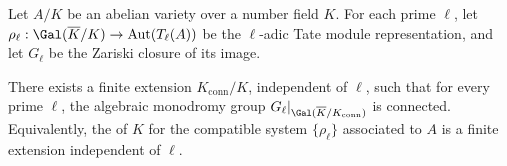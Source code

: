 \begin{theorem} \label{theorem:existence_and_ell_independence_of_connectedness_extension_for_abelian_varieties_over_number_fields}
    Let $A/K$ be an abelian variety over a number field $K$. For each prime $\ell$, let $\rho_\ell : \Gal(\overline{K}/K) \to \mathrm{Aut}(T_\ell(A))$ be the $\ell$-adic Tate module representation, and let $G_\ell$ be the Zariski closure of its image.

    There exists a finite extension $K_{\mathrm{conn}}/K$, independent of $\ell$, such that for every prime $\ell$, the algebraic monodromy group $G_\ell|_{\Gal(\overline{K}/K_{\mathrm{conn}})}$ is connected. Equivalently, the  of $K$ for the compatible system $\{\rho_\ell\}$ associated to $A$ is a finite extension independent of $\ell$.
\end{theorem}
